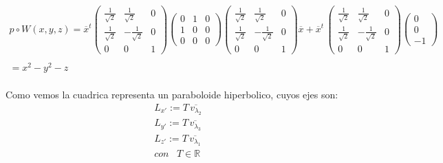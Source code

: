 \documentclass[11pt,letterpaper]{article}
\newcommand{\R}{\mathbb{R}}
\begin{document}
    \begin{align*}
        p\circ W(x,y,z)=\overline{x}^t  \begin{pmatrix}
                \frac{1}{\sqrt{2}} & \frac{1}{\sqrt{2}} & 0\\
                 \frac{1}{\sqrt{2}}&- \frac{1}{\sqrt{2}}& 0\\
                 0& 0 &1
                \end{pmatrix}
                \begin{pmatrix}
                0 & 1 & 0\\
                1 & 0 & 0\\
                0 & 0 & 0
                \end{pmatrix}
                \begin{pmatrix}
                \frac{1}{\sqrt{2}} & \frac{1}{\sqrt{2}} & 0\\
                 \frac{1}{\sqrt{2}}&- \frac{1}{\sqrt{2}}& 0\\
                 0& 0 &1
                \end{pmatrix}\overline{x}+\overline{x}^t\, \begin{pmatrix}
                \frac{1}{\sqrt{2}} & \frac{1}{\sqrt{2}} & 0\\
                 \frac{1}{\sqrt{2}}&- \frac{1}{\sqrt{2}}& 0\\
                 0& 0 &1
                \end{pmatrix}
                \begin{pmatrix}
                0 \\
                0\\
                -1
                \end{pmatrix}\,\\
                \,\\
                =x^2-y^2-z
    \end{align*}\,\\
    Como vemos la cuadrica representa un paraboloide hiperbolico, cuyos ejes son:\,\\
    \begin{align*}
        L_{x'}:=T\,\overline{v_{\lambda_2}}\,\\
        L_{y'}:=T\,\overline{v_{\lambda_3}}\,\\
        L_{z'}:=T\,\overline{v_{\lambda_1}}\,\\
        con\,\,\,\,\,T\in \R
    \end{align*}\,\\
\end{document}
